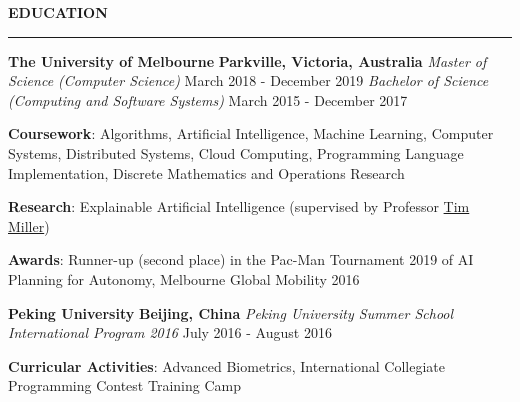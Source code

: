 \documentclass{cv}
\begin{document}
\smallskip


\textbf{\uppercase{Education}}
\sectionlineskip
\hrule height 1.0pt
\begin{list}{}{\setlength{\leftmargin}{0pt}}
\itemsep 2.0pt
\item
    \textbf{The University of Melbourne} \hfill \textbf{Parkville, Victoria, Australia}%
    \vspace{1.0pt} \newline
    {\textit{Master of Science (Computer Science)}} \hfill {March 2018 - December 2019}%
    \newline
    {\textit{Bachelor of Science (Computing and Software Systems)}} \hfill {March 2015 - December 2017}%
    \begin{list}{\raisebox{2.0pt}{\tiny$\bullet$}\space}{\setlength{\leftmargin}{11.2pt}}
        \itemsep -4.0pt \vspace{-4.0pt}
        \item \textbf{Coursework}: Algorithms, Artificial Intelligence, Machine Learning, Computer Systems, Distributed Systems, Cloud Computing, Programming Language Implementation, Discrete Mathematics and Operations Research
        \item \textbf{Research}: Explainable Artificial Intelligence (supervised by Professor \href{https://eecs.uq.edu.au/profile/9477/tim-miller}{Tim Miller})
        \item \textbf{Awards}: Runner-up (second place) in the Pac-Man Tournament 2019 of AI Planning for Autonomy, Melbourne Global Mobility 2016
    \end{list}
\item
    \textbf{Peking University} \hfill \textbf{Beijing, China}%
    \vspace{1.0pt} \newline 
    {\textit{Peking University Summer School International Program 2016}} \hfill {July 2016 - August 2016}%
    \begin{list}{\raisebox{2.0pt}{\tiny$\bullet$}\space}{\setlength{\leftmargin}{11.2pt}}
        \itemsep -4.0pt \vspace{-4.0pt}
        \item \textbf{Curricular Activities}: Advanced Biometrics, International Collegiate Programming Contest Training Camp
    \end{list}
\end{list}
\end{document}

